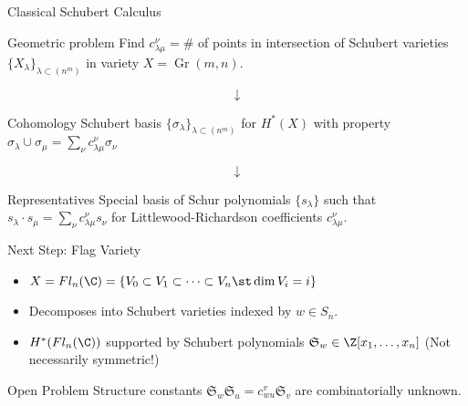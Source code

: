\documentclass{beamer}
\DeclareMathOperator{\Gr}{Gr}
\newcommand{\cupprod}{\cup}
\renewcommand{\S}{\mathfrak{S}}
\begin{document}
\begin{frame}{Classical Schubert Calculus}
    \begin{block}{Geometric problem}
    Find \(c_{\lambda \mu}^\nu = \#\) of points in
    intersection of Schubert varieties \(\{X_\lambda\}_{\lambda
      \subset (n^m)}\) in variety \(X = \Gr(m,n)\). \pause
  \end{block}
  \vspace{-0.1in}
  \[
    \downarrow
  \]
  \vspace{-0.1in}
  \begin{block}{Cohomology}
    Schubert basis \(\{\sigma_\lambda\}_{\lambda \subset (n^m)}\) for \(H^*(X)\) with property \(\sigma_\lambda \cupprod \sigma_\mu = \sum_\nu c_{\lambda \mu}^\nu \sigma_\nu\) %
  \end{block}\pause
\vspace{-0.1in}  
\[
  \downarrow
\]
\vspace{-0.1in}
\begin{block}{Representatives}
  Special basis of Schur polynomials \(\{s_\lambda\}\) such that
  \(s_\lambda \cdot s_\mu = \sum_\nu c_{\lambda \mu}^\nu s_\nu\) for
  Littlewood-Richardson coefficients \(c_{\lambda \mu}^\nu\).
\end{block}
\end{frame}
\begin{frame}{Next Step: Flag Variety}
  \begin{itemize}
  \item
    \(X = Fl_n(\C) = \{V_0 \subset V_1 \subset \cdots \subset
    V_n \st \dim V_i = i\}\) \pause

   \item Decomposes into Schubert varieties indexed by \(w \in S_n\).\pause

    \item \(H^*(Fl_n(\C))\) supported by Schubert polynomials
    \(\S_w \in \Z[x_1, \ldots, x_n]\) (Not necessarily symmetric!) \pause
  \end{itemize}
  \begin{block}{Open Problem}
    Structure constants \(\S_w \S_u = c_{w u}^v \S_v \) are
    combinatorially unknown.
  \end{block}
\end{frame}
\end{document}
